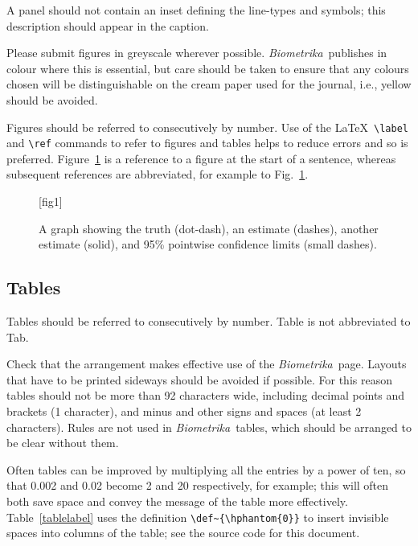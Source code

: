 \documentclass[supplementary,lineno]{biometrika}
\def\Bka{{\it Biometrika}}
\begin{document}
A panel should not contain an inset defining the line-types and symbols; this description should appear in the caption.

Please submit figures in greyscale wherever possible.  \Bka\ publishes in colour where this is essential, but care should be taken to ensure that any colours chosen will be distinguishable on the cream paper used for the journal, i.e., yellow should be avoided.

Figures should be referred to consecutively by number. Use of the \LaTeX\ \verb+\label+ and \verb+\ref+ commands to refer to figures and tables helps to reduce errors and so is preferred.  Figure~\ref{fig1}  is a reference to a figure at the start of a sentence, whereas subsequent references are abbreviated, for example to Fig.~\ref{fig1}.

\begin{figure}
\figurebox{20pc}{25pc}{}[fig1]
\caption{A graph showing the truth (dot-dash), an estimate (dashes), another estimate (solid), and 95\% pointwise confidence limits (small dashes).}
\label{fig1}
\end{figure}

\subsection{Tables}

Tables should be referred to consecutively by number. Table is not abbreviated to Tab.

Check that the arrangement makes effective use
of the \Bka\ page. Layouts that have to be printed sideways should be avoided
if possible. For this reason tables should not be more than 92 characters wide, including
decimal points and brackets (1 character), and minus and other signs and spaces (at least 2
characters).  Rules are not used in \Bka\ tables, which should be arranged to be clear without them.

Often tables can be improved by multiplying all the entries by a power of ten, so that 0.002 and
0.02 become 2 and 20 respectively, for example; this will often both save space and convey the message of the table more effectively. Table~\ref{tablelabel} uses the definition \verb+\def~{\hphantom{0}}+ to insert invisible spaces into columns of the table; see the source code for this document.
\end{document}
